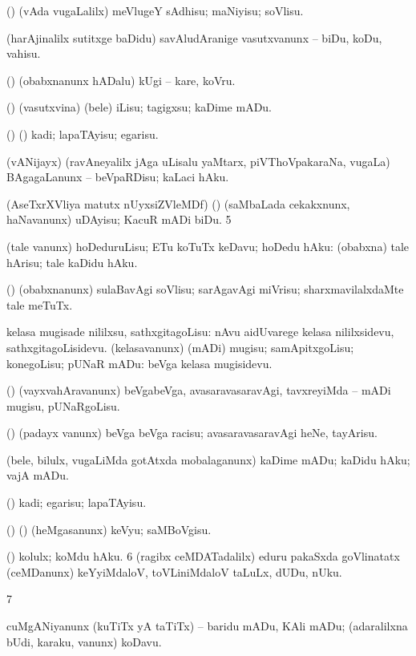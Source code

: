{{ (\rUpa) (vAda \mo vugaLalilx) meVlugeY sAdhisu; maNiyisu; soVlisu. 

 (harAjinalilx sutitxge baDidu) savAludAranige vasutxvanunx -- biDu, koDu, vahisu. 

 (\AmA) (obabxnanunx hADalu) kUgi -- kare, koVru. 

 (\AmA) (vasutxvina) (bele) iLisu; tagigxsu; kaDime mADu. 

 (\ame) (\ashi) kadi; lapaTAyisu; egarisu.

 (vANijayx) (ravAneyalilx jAga uLisalu yaMtarx, piVThoVpakaraNa, \mo vugaLa) BAgagaLanunx -- beVpaRDisu; kaLaci hAku. 

 (AseTxrXVliya matutx nUyxsiZVleMDf) (\ashi) (saMbaLada cekakxnunx, haNavanunx) uDAyisu; KacuR mADi biDu. 
\num{5}  

 (tale \mo vanunx) hoDeduruLisu; ETu koTuTx keDavu; hoDedu hAku:  (obabxna) tale hArisu; tale kaDidu hAku. 

 (\rUpa) (obabxnanunx) sulaBavAgi soVlisu; sarAgavAgi miVrisu; sharxmavilalxdaMte tale meTuTx. 

 kelasa mugisade nililxsu, sathxgitagoLisu:  nAvu aidUvarege kelasa nililxsidevu, 
sathxgitagoLisidevu. 
 (kelasavanunx) (mADi) mugisu; samApitxgoLisu; konegoLisu; pUNaR mADu:  beVga kelasa mugisidevu.

 (\AmA) (vayxvahAravanunx) beVgabeVga, avasaravasaravAgi, tavxreyiMda -- mADi mugisu, pUNaRgoLisu. 

 (\AmA) (padayx \mo vanunx) beVga beVga racisu; avasaravasaravAgi heNe, tayArisu. 

 (bele, bilulx, \mo vugaLiMda gotAtxda mobalaganunx) kaDime mADu; kaDidu hAku; vajA mADu. 

 (\ashi) kadi; egarisu; lapaTAyisu. 

 (\birx) (\ashi) (heMgasanunx) keVyu; saMBoVgisu.

 (\ashi) kolulx; koMdu hAku. 
\num{6}  (ragibx ceMDATadalilx) eduru pakaSxda goVlinatatx (ceMDanunx) keYyiMdaloV, toVLiniMdaloV taLuLx, dUDu, nUku. 

\num{7}  

 cuMgANiyanunx (kuTiTx yA taTiTx) -- baridu mADu, KAli mADu; (adaralilxna bUdi, karaku, \mo vanunx) koDavu.

}}
